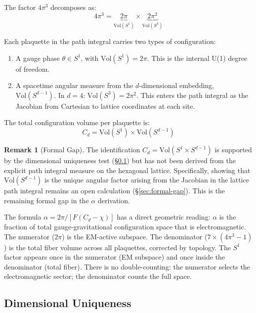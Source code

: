 \documentclass[12pt,a4paper]{article}
\theoremstyle{plain}
\theoremstyle{definition}
\newtheorem{remark}[theorem]{Remark}
\begin{document}
The factor $4\pi^3$ decomposes as:
\begin{equation}\label{eq:measure-decomp}
4\pi^3 = \underbrace{2\pi}_{\mathrm{Vol}(S^1)} \times \underbrace{2\pi^2}_{\mathrm{Vol}(S^3)}
\end{equation}

Each plaquette in the path integral carries two types of configuration:
\begin{enumerate}[nosep, label=(\alph*)]
    \item A gauge phase $\theta \in S^1$, with $\mathrm{Vol}(S^1) = 2\pi$. This is the internal U(1) degree of freedom.
    \item A spacetime angular measure from the $d$-dimensional embedding, $\mathrm{Vol}(S^{d-1})$. In $d = 4$: $\mathrm{Vol}(S^3) = 2\pi^2$. This enters the path integral as the Jacobian from Cartesian to lattice coordinates at each site.
\end{enumerate}

The total configuration volume per plaquette is:
\begin{equation}
C_d = \mathrm{Vol}(S^1) \times \mathrm{Vol}(S^{d-1})
\end{equation}

\begin{remark}[Formal Gap]
The identification $C_d = \mathrm{Vol}(S^1 \times S^{d-1})$ is supported by the dimensional uniqueness test (\S\ref{sec:dim-unique}) but has not been derived from the explicit path integral measure on the hexagonal lattice. Specifically, showing that $\mathrm{Vol}(S^{d-1})$ is the unique angular factor arising from the Jacobian in the lattice path integral remains an open calculation (\S\ref{sec:formal-gap}). This is the remaining formal gap in the $\alpha$ derivation.
\end{remark}

The formula $\alpha = 2\pi/[F(C_d - \chi)]$ has a direct geometric reading: $\alpha$ is the fraction of total gauge-gravitational configuration space that is electromagnetic. The numerator ($2\pi$) is the EM-active subspace. The denominator ($7 \times (4\pi^3 - 1)$) is the total fiber volume across all plaquettes, corrected by topology. The $S^1$ factor appears once in the numerator (EM subspace) and once inside the denominator (total fiber). There is no double-counting: the numerator selects the electromagnetic sector; the denominator counts the full space.

\subsection{Dimensional Uniqueness}\label{sec:dim-unique}
\end{document}
